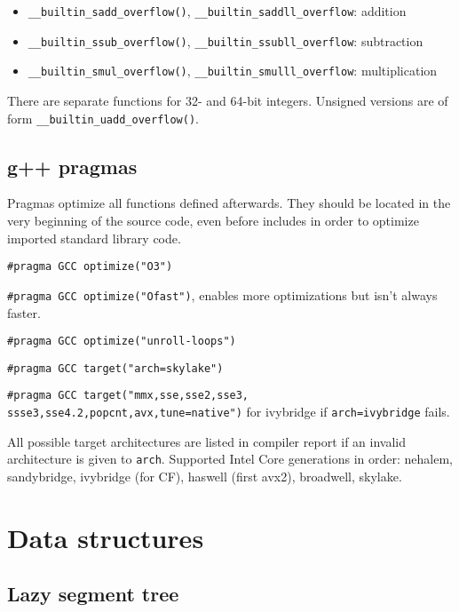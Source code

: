 \documentclass{article}
\begin{document}
\begin{itemize}
	\item \verb|__builtin_sadd_overflow()|, \linebreak \verb|__builtin_saddll_overflow|: addition
	\item \verb|__builtin_ssub_overflow()|, \linebreak \verb|__builtin_ssubll_overflow|: subtraction
	\item \verb|__builtin_smul_overflow()|, \linebreak \verb|__builtin_smulll_overflow|: multiplication
\end{itemize}

There are separate functions for 32- and 64-bit integers. Unsigned versions are of form \verb|__builtin_uadd_overflow()|.

\subsection {g++ pragmas}

Pragmas optimize all functions defined afterwards. They should be located in the very beginning of the source code, even before includes in order to optimize imported standard library code.

\texttt{\#pragma GCC optimize("O3")}

\texttt{\#pragma GCC optimize("Ofast")}, enables more optimizations but isn't always faster.

\texttt{\#pragma GCC optimize("unroll-loops")}

\texttt{\#pragma GCC target("arch=skylake")}

\texttt{\#pragma GCC target("mmx,sse,sse2,sse3,\\ssse3,sse4.2,popcnt,avx,tune=native")} for ivybridge if \texttt{arch=ivybridge} fails.

All possible target architectures are listed in compiler report if an invalid architecture is given to \texttt{arch}. Supported Intel Core generations in order: nehalem, sandybridge, ivybridge (for CF), haswell (first avx2), broadwell, skylake.

\section{Data structures}

\subsection{Lazy segment tree}
\end{document}
